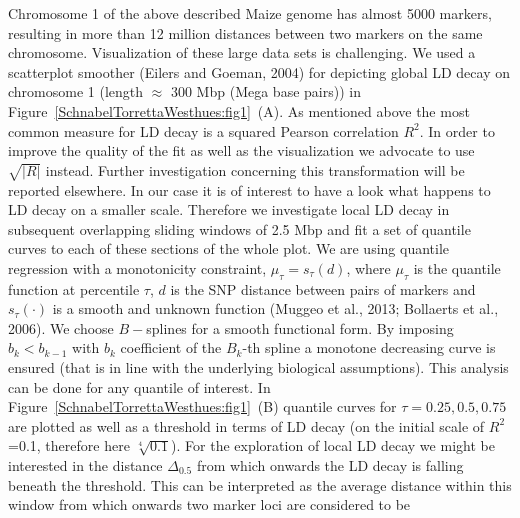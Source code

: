 \documentclass[twoside]{report}
\begin{document}
Chromosome 1 of the above described 
Maize genome has almost 5000 markers, resulting in more than 
12 million distances 
	between two markers on the same chromosome. Visualization of these large data sets is 
	challenging. We used a scatterplot smoother (Eilers and Goeman, 2004) for depicting
	global LD decay on chromosome 1 (length $\approx$ 300 Mbp (Mega base pairs))   
	in Figure~\ref{SchnabelTorrettaWesthues:fig1}~(A). As mentioned above the most 
	common measure for LD decay is a squared Pearson correlation $R^2$. In order to improve the 
	quality of the fit as well as the visualization we advocate to use $\sqrt{|R|}$ instead. Further 
	investigation concerning this transformation will be reported elsewhere. 
	In our case it is of interest to have a look what happens to 
	LD decay on a smaller scale. Therefore we investigate local LD decay in subsequent 
	overlapping sliding windows of 2.5 Mbp and fit a set of quantile curves to each of these 
	sections of the whole plot.  
	We are using quantile 
	regression with a monotonicity constraint,
	$\mu_{\tau}=s_{\tau}(d)$, where $\mu_\tau$ is the quantile function at 
	percentile $\tau$, $d$ is the SNP distance between pairs of markers and 
	$s_{\tau}(\cdot)$ is a smooth and unknown function (Muggeo et al., 2013; Bollaerts et al., 2006). 
	We choose $B-$splines for a smooth functional form. By imposing 
	$b_k<b_{k-1}$ with $b_{k}$ coefficient of the $B_k$-th spline 
%	
	a monotone decreasing curve is ensured (that is 
	in line with the underlying biological assumptions). This analysis can be done for any quantile 
	of interest. In Figure~\ref{SchnabelTorrettaWesthues:fig1}~(B) quantile curves for 
	$\tau={0.25,0.5,0.75}$ are 
	plotted as well as a threshold in terms of LD decay (on the initial scale 
	of $R^2$=0.1, therefore here $\sqrt[4]{0.1}$). For the exploration of local LD decay 
	we might be interested in the distance $\Delta_{0.5}$ from 
	which onwards the LD decay is falling beneath the threshold. This can be interpreted as the
	average distance within this window from which onwards two marker loci are considered to be 
\end{document}
